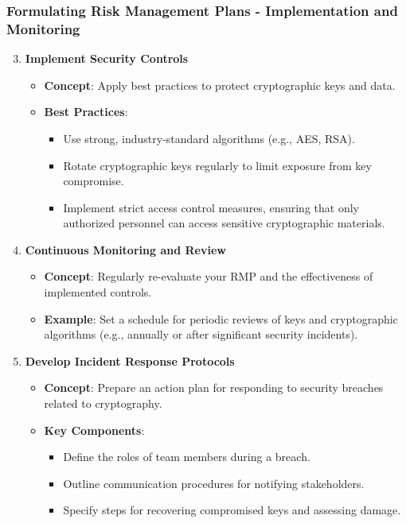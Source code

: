 \documentclass{beamer}
\begin{document}
\begin{frame}[fragile]
    \frametitle{Formulating Risk Management Plans - Implementation and Monitoring}
    \begin{enumerate}
        \setcounter{enumii}{2} %
        \item \textbf{Implement Security Controls}
        \begin{itemize}
            \item \textbf{Concept}: Apply best practices to protect cryptographic keys and data.
            \item \textbf{Best Practices}:
            \begin{itemize}
                \item Use strong, industry-standard algorithms (e.g., AES, RSA).
                \item Rotate cryptographic keys regularly to limit exposure from key compromise.
                \item Implement strict access control measures, ensuring that only authorized personnel can access sensitive cryptographic materials.
            \end{itemize}
        \end{itemize}
    
        \item \textbf{Continuous Monitoring and Review}
        \begin{itemize}
            \item \textbf{Concept}: Regularly re-evaluate your RMP and the effectiveness of implemented controls.
            \item \textbf{Example}: Set a schedule for periodic reviews of keys and cryptographic algorithms (e.g., annually or after significant security incidents).
        \end{itemize}
        
        \item \textbf{Develop Incident Response Protocols}
        \begin{itemize}
            \item \textbf{Concept}: Prepare an action plan for responding to security breaches related to cryptography.
            \item \textbf{Key Components}:
            \begin{itemize}
                \item Define the roles of team members during a breach.
                \item Outline communication procedures for notifying stakeholders.
                \item Specify steps for recovering compromised keys and assessing damage.
            \end{itemize}
        \end{itemize}
    \end{enumerate}
\end{frame}
\end{document}
